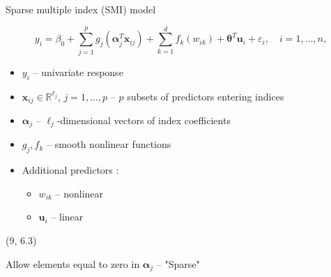 \documentclass[
  12pt,
  ignorenonframetext,
  aspectratio=169,
]{beamer}
\begin{document}
\begin{frame}{Sparse multiple index (SMI) model}
\label{sparse-multiple-index-smi-model-1}
\begin{block}{}
$$y_{i} = \beta_{0} + \sum_{j = 1}^{p}g_{j}(\bm{\alpha}_{j}^{T}\bm{x}_{ij}) + \sum_{k = 1}^{d}f_{k}(w_{ik}) + \bm{\theta}^{T}\bm{u}_{i} + \varepsilon_{i}, \quad i = 1, \dots, n,$$
\end{block}

\begin{itemize}
  \item \small \color{black} $y_{i}$ -- \color{violet} univariate response
  \item \small \color{black} $\bm{x}_{ij} \in \mathbb{R}^{\ell_{j}}$, $j = 1, \dots, p$ -- \color{violet} $p$ subsets of predictors entering indices
  \item \small \color{black} $\bm{\alpha}_{j}$ -- \color{violet} $\ell_{j}$-dimensional vectors of index coefficients
  \item \small \color{black} $g_{j}, f_{k}$ -- \color{violet} smooth nonlinear functions
  \item \small \color{black} Additional predictors :
    \begin{itemize}
      \item \small $w_{ik}$  --   \color{violet} nonlinear 
      \item \small \color{black} $\bm{u}_{i}$  --   \color{violet} linear
    \end{itemize}
\end{itemize}

\begin{textblock}{5.5}(9, 6.3)
\fontsize{11}{12}\sf
\begin{alertblock}{}
\small Allow elements equal to zero in $\bm{\alpha}_{j}$ -- "Sparse"
\end{alertblock}
\end{textblock}
\end{frame}
\end{document}
